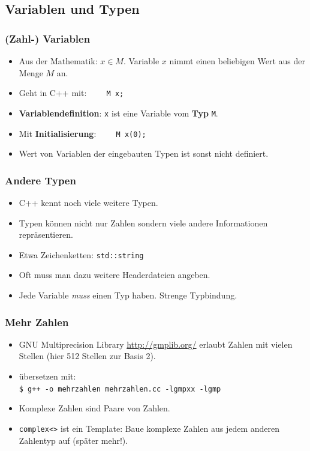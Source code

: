 \subsection{Variablen und Typen}

\begin{frame}[fragile]
\frametitle{(Zahl-) Variablen}
\begin{itemize}
\item Aus der Mathematik: \glqq{}$x\in M$\grqq{}. Variable $x$ nimmt einen
  beliebigen Wert aus der Menge $M$ an.
\item Geht in C++ mit: \lstinline{    M x;}
\item \textbf{Variablendefinition}:
\lstinline{x} ist eine Variable vom \textbf{Typ} \lstinline{M}.
\item Mit \textbf{Initialisierung}: \lstinline{    M x(0);}
\item Wert von Variablen der \glqq{}eingebauten\grqq{} Typen ist sonst
  nicht definiert.
\end{itemize}

\end{frame}

\begin{frame}[fragile]
\frametitle{Andere Typen}
\begin{itemize}
\item C++ kennt noch viele weitere Typen.
\item Typen können nicht nur Zahlen sondern viele andere Informationen
  repräsentieren.
\item Etwa Zeichenketten: \lstinline{std::string}
\item Oft muss man dazu weitere Headerdateien angeben.

\item Jede Variable \textsl{muss} einen Typ haben. Strenge Typbindung.
\end{itemize}
\end{frame}

\begin{frame}[fragile]
\frametitle{Mehr Zahlen}

\begin{itemize}
\item GNU Multiprecision Library \url{http://gmplib.org/} erlaubt
  Zahlen mit vielen Stellen (hier 512 Stellen zur Basis 2).
\item übersetzen mit:
\\ \lstinline{$ g++ -o mehrzahlen mehrzahlen.cc -lgmpxx -lgmp} %
\item Komplexe Zahlen sind Paare von Zahlen.
\item \lstinline{complex<>} ist ein Template: Baue komplexe Zahlen aus
  jedem anderen Zahlentyp auf (später mehr!).
\end{itemize}
\end{frame}

